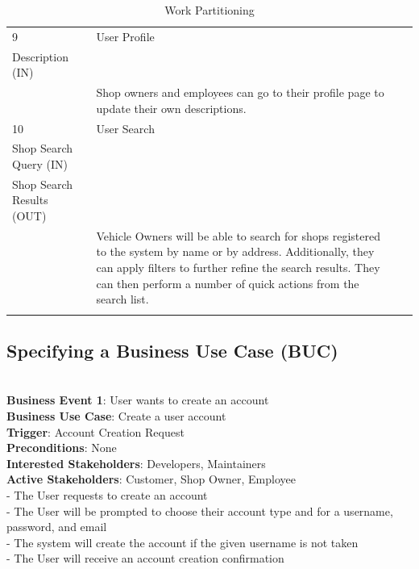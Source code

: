 \documentclass[12pt]{article}
\begin{document}
\begin{longtable}{| l | P{3.3cm} | P{4.7cm} | P{7cm} |}
    9 & User Profile &
    \begin{tabular}{P{4.5cm}}\\
    Description (IN)\\
    \end{tabular} &
    Shop owners and employees can go to their profile page to update their own descriptions.\\
    \hline

    10 & User Search &
    \begin{tabular}{P{4.5cm}}\\
    Shop Search Query (IN)\\
    Shop Search Results (OUT)\\
    \end{tabular} &
    Vehicle Owners will be able to search for shops registered to the system by name or by address. Additionally, they can apply filters to further refine the search results. They can then perform a number of quick actions from the search list.\\
    \hline
    
    \caption{Work Partitioning}
\end{longtable}

\subsection{Specifying a Business Use Case (BUC)}


\\ \textbf{Business Event 1}: User wants to create an account
\\ \textbf{Business Use Case}: Create a user account
\\ \textbf{Trigger}: Account Creation Request
\\ \textbf{Preconditions}: None
\\ \textbf{Interested Stakeholders}: Developers, Maintainers
\\ \textbf{Active Stakeholders}: Customer, Shop Owner, Employee
\\ - The User requests to create an account
\\ - The User will be prompted to choose their account type and for a username, password, and email
\\ - The system will create the account if the given username is not taken
\\ - The User will receive an account creation confirmation
\end{document}
